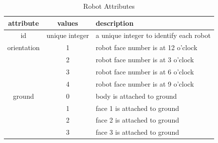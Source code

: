 \documentclass{article}
\begin{document}
\begin{table}[H]
	\begin{center}
	\begin{tabular}{c | c | l}
		\hline \hline
		\textbf{attribute} & \textbf{values} & \textbf{description} \\ \hline
		id & unique integer & a unique integer to identify each robot \\
		orientation & 1 & robot face number is at 12 o'clock \\
		 & 2 & robot face number is at 3 o'clock \\
		 & 3 & robot face number is at 6 o'clock \\
		 & 4 & robot face number is at 9 o'clock \\
		ground & 0 & body is attached to ground \\
		 & 1 & face 1 is attached to ground \\
		 & 2 & face 2 is attached to ground \\
		 & 3 & face 3 is attached to ground \\
		\hline \hline
	\end{tabular}
	\caption{Robot Attributes}
	\label{tab:attributes}
	\end{center}
\end{table}
\end{document}
